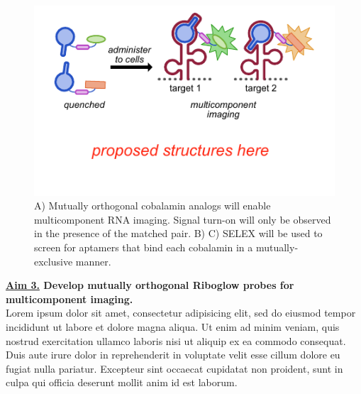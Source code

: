 \begin{figure}
\begin{centering}
\includegraphics[width=\textwidth]{figures/fig3.pdf}

\end{centering}
\footnotesize
\caption{\label{figure:multicomponent}
A) Mutually orthogonal cobalamin analogs will enable multicomponent RNA imaging. Signal turn-on will only be observed in the presence of the matched pair. B) C) SELEX will be used to screen for aptamers that bind each cobalamin in a mutually-exclusive manner.
}
\end{figure}

{\bf \underline{Aim 3.} Develop mutually orthogonal Riboglow probes for multicomponent imaging.}\\
Lorem ipsum dolor sit amet, consectetur adipisicing elit, sed do eiusmod tempor incididunt ut labore et dolore magna aliqua. Ut enim ad minim veniam, quis nostrud exercitation ullamco laboris nisi ut aliquip ex ea commodo consequat. Duis aute irure dolor in reprehenderit in voluptate velit esse cillum dolore eu fugiat nulla pariatur. Excepteur sint occaecat cupidatat non proident, sunt in culpa qui officia deserunt mollit anim id est laborum.


